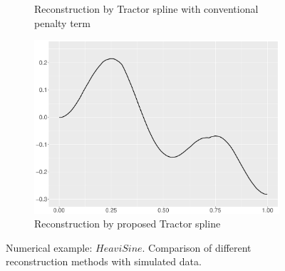 \begin{figure}
\begin{subfigure}{0.45\textwidth}
    \caption{Reconstruction by Tractor spline with conventional penalty term}
    \end{subfigure}
    \begin{subfigure}{0.45\textwidth}
    \centering
    \includegraphics[width=\linewidth,height=0.45\textwidth]{Chapters/02TractorSplineTheory/plot/ggplot/ggHeaviSineTractor.pdf}
    \caption{Reconstruction by proposed Tractor spline}
    \end{subfigure}
\caption{Numerical example: $\textit{HeaviSine}$. Comparison of different reconstruction methods with simulated data.}\label{num3}
 \end{figure}

%
%


